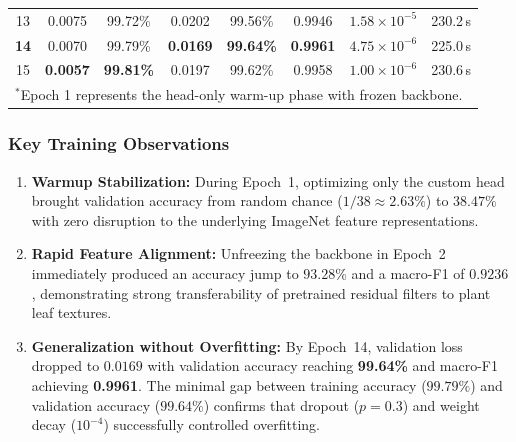 \begin{table}[h]
{\begin{tabular}{@{}cccccccr@{}}
13 & 0.0075 & 99.72\% & 0.0202 & 99.56\% & 0.9946 & $1.58 \times 10^{-5}$ & 230.2\,s \\
\textbf{14} & 0.0070 & 99.79\% & \textbf{0.0169} & \textbf{99.64\%} & \textbf{0.9961} & $4.75 \times 10^{-6}$ & 225.0\,s \\
15 & \textbf{0.0057} & \textbf{99.81\%} & 0.0197 & 99.62\% & 0.9958 & $1.00 \times 10^{-6}$ & 230.6\,s \\
\bottomrule
\multicolumn{8}{l}{\footnotesize $^*$Epoch 1 represents the head-only warm-up phase with frozen backbone.}
\end{tabular}%
}
\end{table}

\subsubsection{Key Training Observations}
\begin{enumerate}[leftmargin=*]
    \item \textbf{Warmup Stabilization:} During Epoch~1, optimizing only the custom head brought validation accuracy from random chance ($1/38 \approx 2.63\%$) to $38.47\%$ with zero disruption to the underlying ImageNet feature representations.
    \item \textbf{Rapid Feature Alignment:} Unfreezing the backbone in Epoch~2 immediately produced an accuracy jump to $93.28\%$ and a macro-F1 of $0.9236$, demonstrating strong transferability of pretrained residual filters to plant leaf textures.
    \item \textbf{Generalization without Overfitting:} By Epoch~14, validation loss dropped to $0.0169$ with validation accuracy reaching \textbf{99.64\%} and macro-F1 achieving \textbf{0.9961}. The minimal gap between training accuracy ($99.79\%$) and validation accuracy ($99.64\%$) confirms that dropout ($p=0.3$) and weight decay ($10^{-4}$) successfully controlled overfitting.
\end{enumerate}


